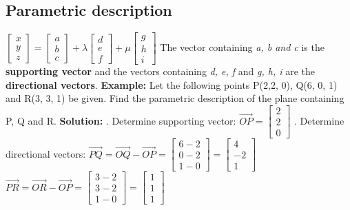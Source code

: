 \subsection{Parametric description}
$\begin{bmatrix} x \\ y \\ z\end{bmatrix} = \begin{bmatrix} a \\ b \\c\end{bmatrix} + \lambda \begin{bmatrix} d \\ e \\ f \end{bmatrix} + \mu \begin{bmatrix} g \\ h \\ i\end{bmatrix}$
\newline
The vector containing \textit{a, b and c} is the \textbf{supporting vector} and the vectors containing \textit{d, e, f} and \textit{g, h, i} are the \textbf{directional vectors}.
\newline
\textbf{Example:}
\newline
Let the following points P(2,2, 0), Q(6, 0, 1) and R(3, 3, 1) be given. Find the parametric description of the plane containing P, Q and R.
\newline
\textbf{Solution:}
. Determine supporting vector: $\vec{OP} = \begin{bmatrix} 2 \\ 2 \\ 0 \end{bmatrix}$
. Determine directional vectors: 
\newline
$\vec{PQ} = \vec{OQ} - \vec{OP} = \begin{bmatrix} 6 - 2 \\ 0 - 2 \\ 1 - 0 \end{bmatrix} = \begin{bmatrix} 4 \\ -2 \\ 1 \end{bmatrix}$
\newline
$\vec{PR} = \vec{OR} - \vec{OP} = \begin{bmatrix} 3 - 2 \\ 3 - 2 \\ 1 - 0 \end{bmatrix} = \begin{bmatrix} 1 \\ 1 \\ 1 \end{bmatrix}$
